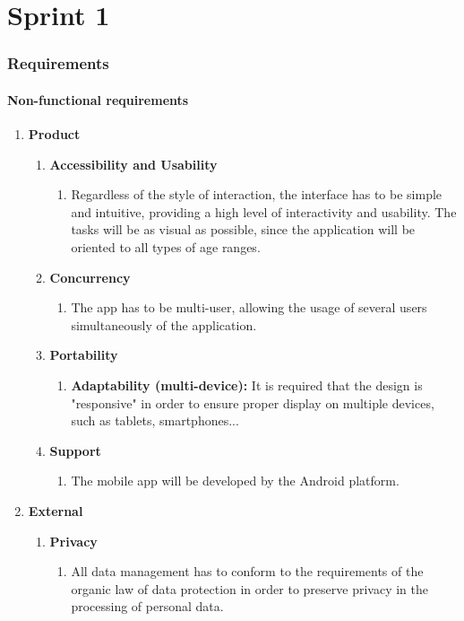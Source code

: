\documentclass[11pt,a4paper]{article}
\begin{document}
\newpage

\part{Sprint 1}
\section{Requirements}
\subsection{Non-functional requirements}
\begin{enumerate}
\item \textbf{Product}
	\begin{enumerate}
	
	\item \textbf{Accessibility and Usability}
		\begin{enumerate}
		\item Regardless of the style of interaction, the interface has to be simple and intuitive, providing a high level of interactivity and usability. The tasks will be as visual as possible, since the application will be oriented to all types of age ranges. 
		\end{enumerate}
	\item \textbf{Concurrency}
		\begin{enumerate}
		\item  The app has to be multi-user, allowing the usage of several users simultaneously of the application.
		\end{enumerate}
		
	\item \textbf{Portability}
		\begin{enumerate}
		\item \textbf{Adaptability (multi-device):} It is required that the design is "responsive" in order to ensure proper display on multiple devices, such as tablets, smartphones...
		\end{enumerate}
		
	\item \textbf{Support}
		\begin{enumerate}
		\item The mobile app will be developed by the Android platform.
		\end{enumerate}
	\end{enumerate}

\item \textbf{External}
	\begin{enumerate}
	\item \textbf{Privacy} 
		\begin{enumerate}
		\item All data management has to conform to the requirements of the organic law of data protection in order to preserve privacy in the processing of personal data.
		\end{enumerate}
		

\end{enumerate}
\end{enumerate}
\end{document}
